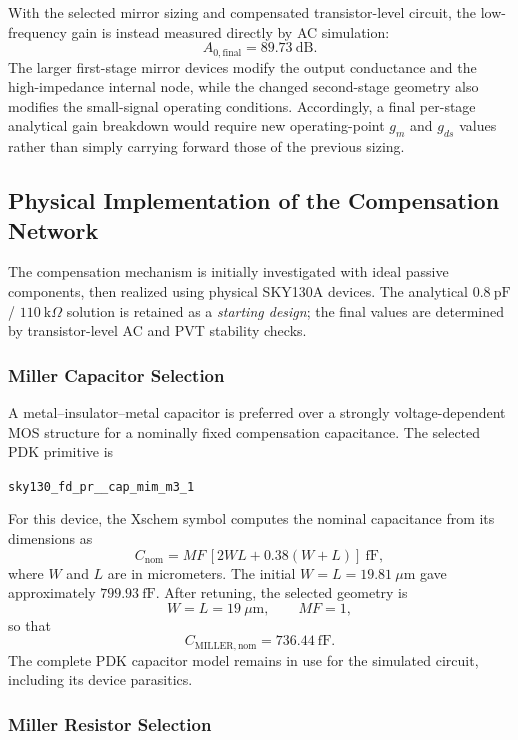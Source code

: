 With the selected mirror sizing and compensated transistor-level
circuit, the low-frequency gain is instead measured directly by AC
simulation:
\[
\boxed{A_{0,\mathrm{final}}=89.73~\mathrm{dB}.}
\]
The larger first-stage mirror devices modify the output conductance
and the high-impedance internal node, while the changed second-stage
geometry also modifies the small-signal operating conditions.
Accordingly, a final per-stage analytical gain breakdown would require
new operating-point $g_m$ and $g_{ds}$ values rather than simply
carrying forward those of the previous sizing.

\subsection{Physical Implementation of the Compensation Network}

The compensation mechanism is initially investigated with ideal
passive components, then realized using physical SKY130A devices.
The analytical $0.8~\mathrm{pF}$ / $110~\mathrm{k}\Omega$ solution is
retained as a \emph{starting design}; the final values are determined
by transistor-level AC and PVT stability checks.

\subsubsection{Miller Capacitor Selection}

A metal--insulator--metal capacitor is preferred over a strongly
voltage-dependent MOS structure for a nominally fixed compensation
capacitance. The selected PDK primitive is
\begin{center}
\texttt{sky130\_fd\_pr\_\_cap\_mim\_m3\_1}
\end{center}
For this device, the Xschem symbol computes the nominal capacitance
from its dimensions as
\[
C_{\mathrm{nom}}=MF\,[2WL+0.38(W+L)]~\mathrm{fF},
\]
where $W$ and $L$ are in micrometers. The initial
$W=L=19.81~\mu\mathrm{m}$ gave approximately
$799.93~\mathrm{fF}$. After retuning, the selected geometry is
\[
W=L=19~\mu\mathrm{m},\qquad MF=1,
\]
so that
\[
\boxed{C_{\mathrm{MILLER,nom}}=736.44~\mathrm{fF}.}
\]
The complete PDK capacitor model remains in use for the simulated
circuit, including its device parasitics.

\subsubsection{Miller Resistor Selection}

